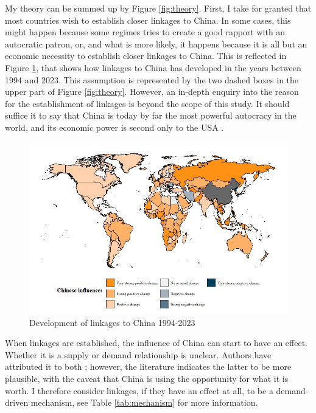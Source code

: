 My theory can be summed up by Figure \ref{fig:theory}. First, I take for granted that most countries wish to establish closer linkages to China. In some cases, this might happen because some regimes tries to create a good rapport with an autocratic patron, or, and what is more likely, it happens because it is all but an economic necessity to establish closer linkages to China. This is reflected in Figure \ref{fig:link-china}, that shows how linkages to China has developed in the years between 1994 and 2023. This assumption is represented by the two dashed boxes in the upper part of Figure \ref{fig:theory}. However, an in-depth enquiry into the reason for the establishment of linkages is beyond the scope of this study. It should suffice it to say that China is today by far the most powerful autocracy in the world, and its economic power is second only to the USA \citep{imf_world_2025}. 

\begin{figure}
    \centering
    \includegraphics[width=\linewidth]{graphics/chinese_influence.jpeg}
    \caption{Development of linkages to China 1994-2023}
    \label{fig:link-china}
\end{figure}

When linkages are established, the influence of China can start to have an effect. Whether it is a supply or demand relationship is unclear. Authors have attributed it to both \citep[e.g., see:][]{ambrosio_rise_2012, bader_china_2015, brand_authoritarian_2015, economy_exporting_2020, gamso_is_2021, loughlin_chinese_2021, risse_democracy_2015, toettoe_foreign_2023, weyland_autocratic_2017}; however, the literature indicates the latter to be more plausible, with the caveat that China is using the opportunity for what it is worth. I therefore consider linkages, if they have an effect at all, to be a demand-driven mechanism, see Table \ref{tab:mechanism} for more information. 

